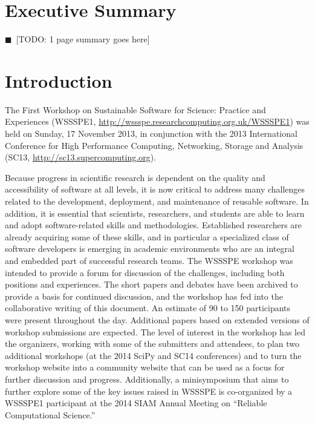 \documentclass[11pt, oneside]{amsart}
\newcommand{\todo}[1]{{\color{blue}$\blacksquare$~\textsf{[TODO: #1]}}}
\newcommand{\note}[1]{ {\textcolor{red}    { #1 }}}
\begin{document}
\pagebreak

\section*{Executive Summary}

\todo{1 page summary goes here}

\pagebreak

\section{Introduction}

The First Workshop on Sustainable Software for Science: Practice and
Experiences (WSSSPE1,
\url{http://wssspe.researchcomputing.org.uk/WSSSPE1}) was held on
Sunday, 17 November 2013, in conjunction with the 2013 International
Conference for High Performance Computing, Networking, Storage and
Analysis (SC13, \url{http://sc13.supercomputing.org}).

Because progress in scientific research is dependent on the quality and
accessibility of software at all levels, it is now critical to address many
challenges related to the development, deployment, and maintenance of reusable
software.
In addition, it is essential that scientists,
researchers, and students are able to learn and adopt software-related skills
and methodologies. Established researchers are already acquiring some of these
skills, and in particular a specialized class of software developers is
emerging in academic environments who are an integral and embedded part of
successful research teams. The WSSSPE workshop was intended to provide a forum
for discussion of the challenges, including both positions and experiences. The
short papers and debates have been archived to provide a basis for continued
discussion, and the workshop has fed into the collaborative writing of this
document. An estimate of 90 to 150 participants were present
throughout the day. Additional papers based on extended versions of workshop
submissions are expected. The level of interest in the workshop has led the
organizers, working with some of the submitters and attendees, to plan two
additional workshops (at the 2014 SciPy and SC14 conferences) and to turn the
workshop website into a community website that can be used as a focus for
further discussion and progress. Additionally, a minisymposium that aims to
further explore some of the key issues raised in WSSSPE is co-organized by a
WSSSPE1 participant at the 2014 SIAM Annual Meeting on ``Reliable
Computational Science.''
\end{document}
